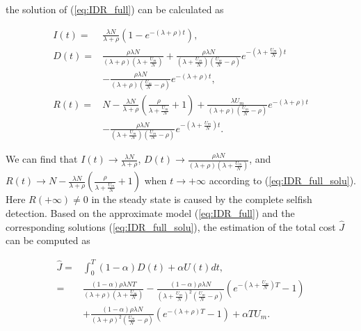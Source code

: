 the solution of (\ref{eq:IDR_full}) can be calculated as
\begin{small}
\begin{equation}
\label{eq:IDR_full_solu}
\begin{aligned}
I(t) =& \frac{ \lambda N }{ \lambda + \rho }(1- e^{-(\lambda + \rho)t}),\\
D(t) =& \frac{ \rho \lambda N }{ (\lambda + \rho)(\lambda + \frac{U_{m}}{N}) }
+ \frac{\rho \lambda N}{(\lambda + \frac{U_{m}}{N})(\frac{U_{m}}{N} - \rho)}  e^{-(\lambda + \frac{U_{m}}{N})t}\\
& - \frac{ \rho \lambda N }{ (\lambda + \rho)(\frac{U_{m}}{N} - \rho) } e^{-(\lambda + \rho)t},\\
R(t) =& N - \frac{ \lambda N }{ \lambda + \rho } \left( \frac{\rho}{\lambda + \frac{U_{m}}{N}} + 1 \right)
+ \frac{ \lambda U_{m} }{ (\lambda + \rho)(\frac{U_{m}}{N} - \rho) } e^{-(\lambda + \rho)t}\\
& - \frac{\rho \lambda N}{(\lambda + \frac{U_{m}}{N})(\frac{U_{m}}{N} - \rho)}  e^{-(\lambda + \frac{U_{m}}{N})t}.
\end{aligned}
\end{equation}
\end{small}
We can find that $I(t) \rightarrow \frac{ \lambda N }{ \lambda + \rho }$,
$D(t) \rightarrow \frac{ \rho \lambda N }{ (\lambda + \rho)(\lambda + \frac{U_{m}}{N}) }$,
and $R(t) \rightarrow  N - \frac{ \lambda N }{ \lambda + \rho } \left( \frac{\rho}{\lambda + \frac{U_{m}}{N}} + 1 \right)$
when $t \rightarrow +\infty$ according to (\ref{eq:IDR_full_solu}).
Here $R(+\infty) \neq 0$ in the steady state
is caused by the complete selfish detection.
Based on the approximate model (\ref{eq:IDR_full})
and the corresponding solutions (\ref{eq:IDR_full_solu}),
the estimation of the total cost $\hat{J}$
can be computed as
\begin{small}
\begin{equation}
\label{eq:IDR_full_J}
\begin{aligned}
\hat{J} =& \int_{0}^{T} (1-\alpha) D(t) + \alpha U(t) dt, \\
=& \frac{ (1-\alpha) \rho \lambda N T }{ (\lambda + \rho)(\lambda + \frac{U_{m}}{N}) }
- \frac{(1-\alpha) \rho \lambda N}{ {(\lambda + \frac{U_{m}}{N})}^{2} (\frac{U_{m}}{N} - \rho)}
(e^{-(\lambda + \frac{U_{m}}{N})T} - 1 ) \\
&+ \frac{(1-\alpha) \rho \lambda N }{ {(\lambda + \rho)}^{2} (\frac{U_{m}}{N} - \rho) }
(e^{-(\lambda + \rho)T} - 1 )
+ \alpha T U_{m}.
\end{aligned}
\end{equation}
\end{small}
